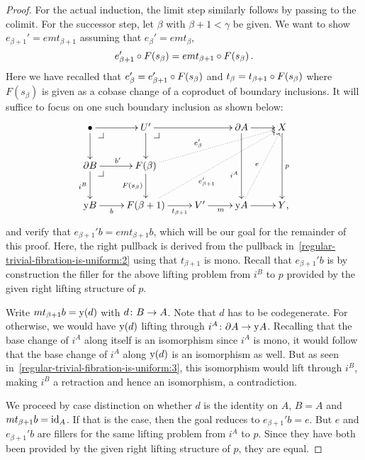 \documentclass[reqno,10pt,a4paper,oneside,draft]{amsart}
\begin{document}
\begin{proof}
For the actual induction, the limit step similarly follows by passing to the colimit.
For the successor step, let $\beta$ with $\beta + 1 < \gamma$ be given.
We want to show $e_{\beta+1}' = e m t_{\beta+1}$ assuming that $e_{\beta}' = e m t_{\beta}$, \ie
\begin{equation} \label{regular-trivial-fibration-is-uniform:ih}
  e_{\beta+1}' \mathbin{\circ} F(s_{\beta}) = e m t_{\beta+1} \mathbin{\circ} F(s_{\beta}) \, .
\end{equation}
Here we have recalled that $e_{\beta}' = e_{\beta+1}' \mathbin{\circ} F(s_{\beta})$ and $t_{\beta} = t_{\beta+1} \mathbin{\circ} F(s_{\beta})$ where $F(s_{\beta})$ is given as a cobase change of a coproduct of boundary inclusions.
It will suffice to focus on one such boundary inclusion as shown below:
\begin{equation} \label{regular-trivial-fibration-is-uniform:3}
\xycenter{
  \bullet
  \ar[r]
  \ar[d]
  \pullback{dr}
&
  U'
  \ar[rr]
  \ar[d]
  \pullback{dr}
&&
  \partial A
  \ar[r]
  \ar[dd]_(0.6){i^A}
&
  X
  \ar[dd]^{p}
\\
  \partial B
  \ar[r]^{b'}
  \ar[d]_{i^B}
  \pullback{dr}
&
  F(\beta)
  \ar[d]_{F(s_{\beta})}
  \ar@{.>}[urrr]^(0.4){e_{\beta}'}
\\
  \yon B
  \ar[r]_-{b}
&
  F(\beta+1)
  \ar[r]_-{t_{\beta+1}}
  \ar@{.>}[uurrr]_(0.4){e_{\beta+1}'}
&
  V'
  \ar[r]_{m}
&
  \yon A
  \ar[r]
  \ar@{.>}[uur]^{e}
&
  Y
\rlap{,}}
\end{equation}
and verify that $e_{\beta+1}' b = e m t_{\beta+1} b$, which will be our goal for the remainder of this proof.
Here, the right pullback is derived from the pullback in~\eqref{regular-trivial-fibration-is-uniform:2} using that $t_{\beta+1}$ is mono.
Recall that $e_{\beta+1}' b$ is by construction the filler for the above lifting problem from $i^B$ to $p$ provided by the given right lifting structure of $p$.

Write $m t_{\beta+1} b = \mathrm{y}(d)$ with $d \colon B \to A$.
Note that $d$ has to be codegenerate.
For otherwise, we would have $\mathrm{y}(d)$ lifting through $i^A \colon \partial A \to \mathrm{y} A$.
Recalling that the base change of $i^A$ along itself is an isomorphism since $i^A$ is mono, it would follow that the base change of $i^A$ along $\mathrm{y}(d)$ is an isomorphism as well.
But as seen in~\eqref{regular-trivial-fibration-is-uniform:3}, this isomorphism would lift through $i^B$, making $i^B$ a retraction and hence an isomorphism, a contradiction.

We proceed  by case distinction on whether $d$ is the identity on $A$, \ie $B = A$ and $m t_{\beta+1} b = \operatorname{id}_A$.
If that is the case, then the goal reduces to $e_{\beta+1}' b = e$.
But $e$ and $e_{\beta+1}' b$ are fillers for the same lifting problem from $i^A$ to $p$.
Since they have both been provided by the given right lifting structure of $p$, they are equal.


\end{proof}
\end{document}
